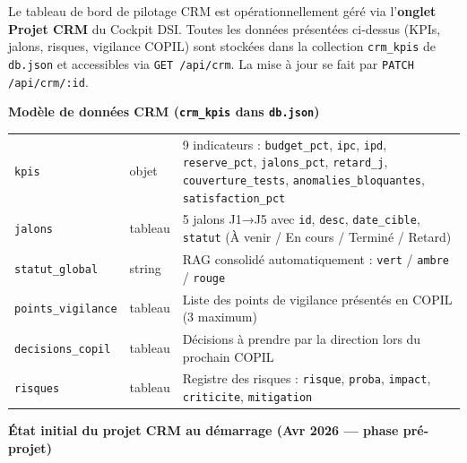 \documentclass[11pt,a4paper,oneside]{report}
\begin{document}
\begin{finding}
Le tableau de bord de pilotage CRM est opérationnellement géré via l'\textbf{onglet Projet CRM} du Cockpit DSI. Toutes les données présentées ci-dessus (KPIs, jalons, risques, vigilance COPIL) sont stockées dans la collection \texttt{crm\_kpis} de \texttt{db.json} et accessibles via \texttt{GET /api/crm}. La mise à jour se fait par \texttt{PATCH /api/crm/:id}.
\end{finding}

\textbf{Modèle de données CRM (\texttt{crm\_kpis} dans \texttt{db.json})}

\vspace{4pt}
\begin{center}
\renewcommand{\arraystretch}{1.5}
\begin{tabularx}{\textwidth}{L{3.8cm} L{2.5cm} L{7.5cm}}
\toprule
{}
 &  &  \\
\midrule
\texttt{kpis} & objet & 9 indicateurs : \texttt{budget\_pct}, \texttt{ipc}, \texttt{ipd}, \texttt{reserve\_pct}, \texttt{jalons\_pct}, \texttt{retard\_j}, \texttt{couverture\_tests}, \texttt{anomalies\_bloquantes}, \texttt{satisfaction\_pct} \\
\texttt{jalons} & tableau & 5 jalons J1→J5 avec \texttt{id}, \texttt{desc}, \texttt{date\_cible}, \texttt{statut} (À venir / En cours / Terminé / Retard) \\
\texttt{statut\_global} & string & RAG consolidé automatiquement : \texttt{vert} / \texttt{ambre} / \texttt{rouge} \\
\texttt{points\_vigilance} & tableau & Liste des points de vigilance présentés en COPIL (3 maximum) \\
\texttt{decisions\_copil} & tableau & Décisions à prendre par la direction lors du prochain COPIL \\
\texttt{risques} & tableau & Registre des risques : \texttt{risque}, \texttt{proba}, \texttt{impact}, \texttt{criticite}, \texttt{mitigation} \\
\bottomrule
\end{tabularx}
\end{center}

\textbf{État initial du projet CRM au démarrage (Avr 2026 — phase pré-projet)}
\end{document}
